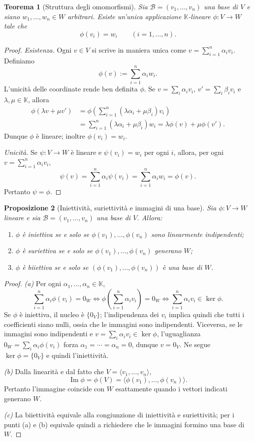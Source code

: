 \documentclass[11pt,a4paper]{article}
\newcommand{\KK}{\mathbb{K}}
\theoremstyle{plain}
\newtheorem{prop}{Proposizione}[section]
\newtheorem{teo}[prop]{Teorema}
\theoremstyle{definition}
\theoremstyle{remark}
\begin{document}
\begin{teo}[Struttura degli omomorfismi]
Sia $\mathcal B=(v_1,\ldots,v_n)$ una base di $V$ e siano
$w_1,\ldots,w_n\in W$ arbitrari. Esiste un'unica applicazione
$\KK$-lineare $\phi:V\to W$ tale che
\[
 \phi(v_i)=w_i\qquad(i=1,\ldots,n).
\]
\end{teo}
\begin{proof}
\emph{Esistenza.} Ogni $v\in V$ si scrive in maniera unica come
$v=\sum_{i=1}^n\alpha_i v_i$. Definiamo
\[
 \phi(v):=\sum_{i=1}^n\alpha_i w_i.
\]
L'unicità delle coordinate rende ben definita $\phi$. Se
$v=\sum_i\alpha_i v_i$, $v'=\sum_i\beta_i v_i$ e
$\lambda,\mu\in\KK$, allora
\begin{align*}
 \phi(\lambda v+\mu v')
 &=\phi\!\left(\sum_{i=1}^n(\lambda\alpha_i+\mu\beta_i)v_i\right)\\
 &=\sum_{i=1}^n(\lambda\alpha_i+\mu\beta_i)w_i
 =\lambda\phi(v)+\mu\phi(v').
\end{align*}
Dunque $\phi$ è lineare; inoltre $\phi(v_i)=w_i$.

\emph{Unicità.} Se $\psi:V\to W$ è lineare e
$\psi(v_i)=w_i$ per ogni $i$, allora, per ogni
$v=\sum_{i=1}^n\alpha_i v_i$,
\[
 \psi(v)=\sum_{i=1}^n\alpha_i\psi(v_i)
 =\sum_{i=1}^n\alpha_i w_i=\phi(v).
\]
Pertanto $\psi=\phi$.
\end{proof}

\begin{prop}[Iniettività, suriettività e immagini di una base]
Sia $\phi:V\to W$ lineare e sia
$\mathcal B=(v_1,\ldots,v_n)$ una base di $V$. Allora:
\begin{enumerate}[label=(\alph*)]
\item $\phi$ è iniettiva se e solo se
$\phi(v_1),\ldots,\phi(v_n)$ sono linearmente indipendenti;
\item $\phi$ è suriettiva se e solo se
$\phi(v_1),\ldots,\phi(v_n)$ generano $W$;
\item $\phi$ è biiettiva se e solo se
$(\phi(v_1),\ldots,\phi(v_n))$ è una base di $W$.
\end{enumerate}
\end{prop}
\begin{proof}
\emph{(a)} Per ogni $\alpha_1,\ldots,\alpha_n\in\KK$,
\[
 \sum_{i=1}^n\alpha_i\phi(v_i)=0_W
 \iff\phi\!\left(\sum_{i=1}^n\alpha_i v_i\right)=0_W
 \iff\sum_{i=1}^n\alpha_i v_i\in\ker\phi.
\]
Se $\phi$ è iniettiva, il nucleo è $\{0_V\}$; l'indipendenza
dei $v_i$ implica quindi che tutti i coefficienti siano nulli,
ossia che le immagini sono indipendenti.
Viceversa, se le immagini sono indipendenti e
$v=\sum_i\alpha_i v_i\in\ker\phi$, l'uguaglianza
$0_W=\sum_i\alpha_i\phi(v_i)$ forza
$\alpha_1=\cdots=\alpha_n=0$, dunque $v=0_V$.
Ne segue $\ker\phi=\{0_V\}$ e quindi l'iniettività.

\emph{(b)} Dalla linearità e dal fatto che $V=\langle v_1,\ldots,v_n\rangle$,
\[
 \operatorname{Im}\phi
 =\phi(V)=\langle\phi(v_1),\ldots,\phi(v_n)\rangle.
\]
Pertanto l'immagine coincide con $W$ esattamente quando i vettori
indicati generano $W$.

\emph{(c)} La biiettività equivale alla congiunzione di iniettività
e suriettività; per i punti (a) e (b) equivale quindi a richiedere
che le immagini formino una base di $W$.
\end{proof}
\end{document}
